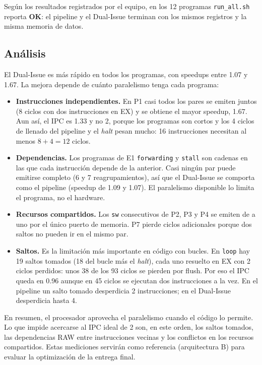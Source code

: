 \documentclass[12pt,a4paper]{article}
\begin{document}
Según los resultados registrados por el equipo, en los 12 programas \texttt{run\_all.sh} reporta \textbf{OK}: el pipeline y el Dual-Issue terminan con los mismos registros y la misma memoria de datos.

\subsection{Análisis}

El Dual-Issue es más rápido en todos los programas, con speedups entre 1.07 y 1.67. La mejora depende de cuánto paralelismo tenga cada programa:

\begin{itemize}
    \item \textbf{Instrucciones independientes.} En P1 casi todos los pares se emiten juntos (8 ciclos con dos instrucciones en EX) y se obtiene el mayor speedup, 1.67. Aun así, el IPC es 1.33 y no 2, porque los programas son cortos y los 4 ciclos de llenado del pipeline y el \textit{halt} pesan mucho: 16 instrucciones necesitan al menos $8 + 4 = 12$ ciclos.
    \item \textbf{Dependencias.} Los programas de E1 \texttt{forwarding} y \texttt{stall} son cadenas en las que cada instrucción depende de la anterior. Casi ningún par puede emitirse completo (6 y 7 reagrupamientos), así que el Dual-Issue se comporta como el pipeline (speedup de 1.09 y 1.07). El paralelismo disponible lo limita el programa, no el hardware.
    \item \textbf{Recursos compartidos.} Los \texttt{sw} consecutivos de P2, P3 y P4 se emiten de a uno por el único puerto de memoria. P7 pierde ciclos adicionales porque dos saltos no pueden ir en el mismo par.
    \item \textbf{Saltos.} Es la limitación más importante en código con bucles. En \texttt{loop} hay 19 saltos tomados (18 del bucle más el \textit{halt}), cada uno resuelto en EX con 2 ciclos perdidos: unos 38 de los 93 ciclos se pierden por flush. Por eso el IPC queda en 0.96 aunque en 45 ciclos se ejecutan dos instrucciones a la vez. En el pipeline un salto tomado desperdicia 2 instrucciones; en el Dual-Issue desperdicia hasta 4.
\end{itemize}

En resumen, el procesador aprovecha el paralelismo cuando el código lo permite. Lo que impide acercarse al IPC ideal de 2 son, en este orden, los saltos tomados, las dependencias RAW entre instrucciones vecinas y los conflictos en los recursos compartidos. Estas mediciones servirán como referencia (arquitectura B) para evaluar la optimización de la entrega final.
\end{document}
